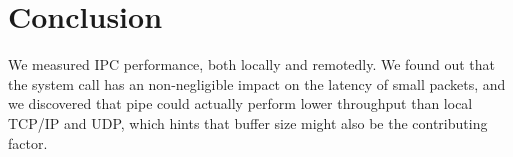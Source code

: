 \section{Conclusion}
We measured IPC performance, both locally and remotedly. We found out that the system call has an non-negligible impact on the latency of small packets, and we discovered that pipe could actually perform lower throughput than local TCP/IP and UDP, which hints that buffer size might also be the contributing factor.